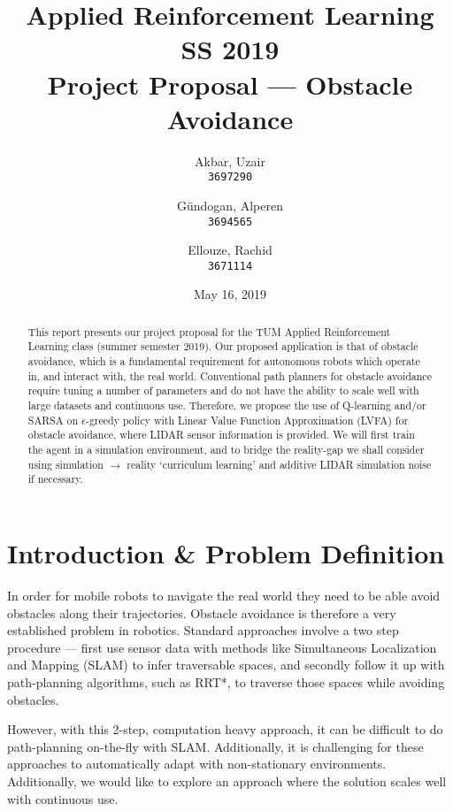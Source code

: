\documentclass{article}
\title{Applied Reinforcement Learning\\
        \vspace{-0.25cm}
        {\large SS 2019}\\
        \vspace{0.25cm}
        {Project Proposal --- Obstacle Avoidance}}
\author{
  \small Akbar, Uzair\\
  \small \texttt{3697290}
  \and
  \small G\"undogan, Alperen\\
  \small \texttt{3694565}
  \and
  \small Ellouze, Rachid \\
  \small \texttt{3671114}
}
\date{May 16, 2019}
\begin{document}
\begin{titlingpage}
    \maketitle
    \begin{abstract}
        This report presents our project proposal for the TUM Applied Reinforcement Learning class (summer semester 2019). Our proposed application is that of obstacle avoidance, which is a fundamental requirement for autonomous robots which operate in, and interact with, the real world. Conventional path planners for obstacle avoidance require tuning a number of parameters and do not have the ability to scale well with large datasets and continuous use. Therefore, we propose the use of Q-learning and/or SARSA on $\epsilon$-greedy policy with Linear Value Function Approximation (LVFA) for obstacle avoidance, where LIDAR sensor information is provided. We will first train the agent in a simulation environment, and to bridge the reality-gap we shall consider using simulation $\rightarrow$ reality `curriculum learning' and additive LIDAR simulation noise if necessary.
    \end{abstract}
    \tableofcontents
\end{titlingpage}


\section{Introduction \& Problem Definition}
In order for mobile robots to navigate the real world they need to be able avoid obstacles along their trajectories. Obstacle avoidance is therefore a very established problem in robotics. Standard approaches involve a two step procedure --- first use sensor data with methods like Simultaneous Localization and Mapping (SLAM) to infer traversable spaces, and secondly follow it up with path-planning algorithms, such as RRT*, to traverse those spaces while avoiding obstacles.

However, with this 2-step, computation heavy approach, it can be difficult to do path-planning on-the-fly with SLAM. Additionally, it is challenging for these approaches to automatically adapt with non-stationary environments. Additionally, we would like to explore an approach where the solution scales well with continuous use.
\end{document}
